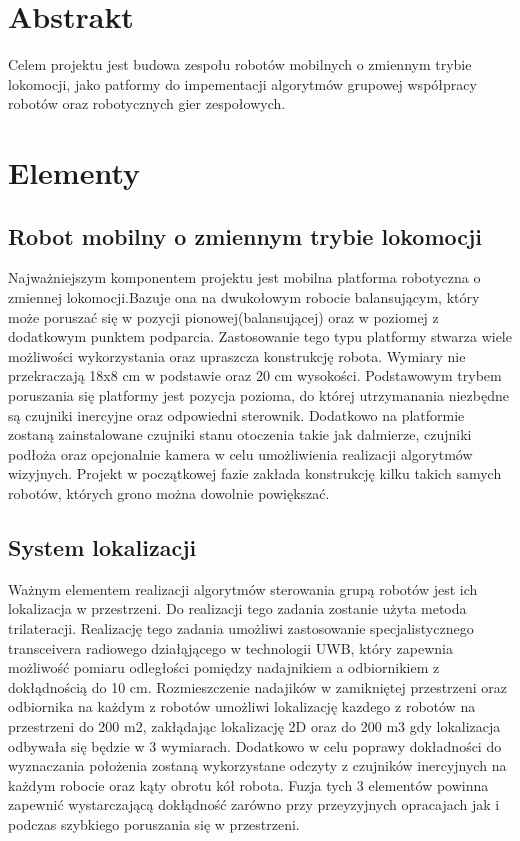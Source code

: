 \documentclass[a4paper, 12pt]{article}
\begin{document}
	
\section{Abstrakt}
Celem projektu jest budowa zespołu robotów mobilnych o zmiennym trybie lokomocji, jako patformy do impementacji algorytmów grupowej współpracy robotów oraz robotycznych gier zespołowych.


\section{Elementy}
\subsection{Robot mobilny o zmiennym trybie lokomocji}
Najważniejszym komponentem projektu jest mobilna platforma robotyczna o zmiennej lokomocji.Bazuje ona na dwukołowym robocie balansującym, który może poruszać się w pozycji pionowej(balansującej) oraz w poziomej z dodatkowym punktem podparcia. Zastosowanie tego typu platformy stwarza wiele możliwości wykorzystania oraz upraszcza konstrukcję robota. Wymiary nie przekraczają 18x8 cm w podstawie oraz 20 cm wysokości. Podstawowym trybem poruszania się platformy jest pozycja pozioma, do której utrzymanania niezbędne są czujniki inercyjne oraz odpowiedni sterownik. Dodatkowo na platformie zostaną zainstalowane czujniki stanu otoczenia takie jak dalmierze, czujniki podłoża oraz opcjonalnie kamera w celu umożliwienia realizacji algorytmów wizyjnych. Projekt w początkowej fazie zakłada konstrukcję kilku takich samych robotów, których grono można dowolnie powiększać. 

\subsection{System lokalizacji}
Ważnym elementem realizacji algorytmów sterowania grupą robotów jest ich lokalizacja w przestrzeni. Do realizacji tego zadania zostanie użyta metoda trilateracji. Realizację tego zadania umożliwi zastosowanie specjalistycznego transceivera radiowego działąjącego w technologii UWB, który zapewnia możliwość pomiaru odległości pomiędzy nadajnikiem a odbiornikiem z dokłądnością do 10 cm. Rozmieszczenie nadajików w zamikniętej przestrzeni oraz odbiornika na każdym z robotów umożliwi lokalizację kazdego z robotów na przestrzeni do 200 m2, zakłądając lokalizację 2D oraz do 200 m3 gdy lokalizacja odbywała się będzie w 3 wymiarach. Dodatkowo w celu poprawy dokładności do wyznaczania położenia zostaną wykorzystane odczyty z czujników inercyjnych na każdym robocie oraz kąty obrotu kół robota. Fuzja tych 3 elementów powinna zapewnić wystarczającą dokłądność zarówno przy przeyzyjnych opracajach jak i podczas szybkiego poruszania się w przestrzeni.
\end{document}
